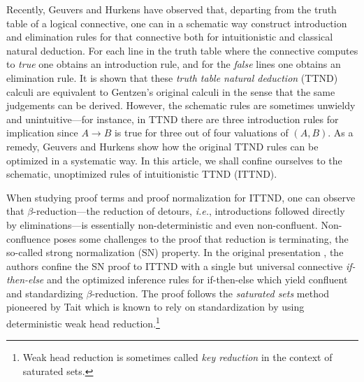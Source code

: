 \documentclass[a4paper,USenglish,cleveref, autoref, thm-restate]{lipics-v2021}
\newcommand{\ie}{\emph{i.e.}\xspace}
\begin{document}
Recently, Geuvers and Hurkens \cite{geuversHurkens:icla17} have
observed that, departing from the truth table of a logical connective,
one can in a schematic way construct introduction and elimination
rules for that connective both for intuitionistic and classical
natural deduction.  For each line in the truth table where the
connective computes to \emph{true} one obtains an introduction rule,
and for the \emph{false} lines one obtains an elimination rule.
It is shown that these \emph{truth table natural deduction} (TTND)
calculi are equivalent to Gentzen's original calculi
\cite{gentzen:natuerlichesSchliessen}
in the sense that the
same judgements can be derived.  However, the schematic rules are
sometimes unwieldy and unintuitive---for instance, in TTND there are three
introduction rules for implication since $A \to B$ is true for three
out of four valuations of $(A,B)$.  As a remedy, Geuvers and Hurkens
show how the original TTND rules can be optimized in a systematic
way.  In this article, we shall confine ourselves to the schematic,
unoptimized rules of intuitionistic TTND (ITTND).

When studying proof terms and proof normalization for ITTND, one can
observe that $\beta$-reduction---the reduction of detours, \ie, introductions followed
directly by eliminations\footnotemark---is essentially non-deterministic and even
non-confluent.
%
Non-confluence poses some challenges to the proof that reduction is
terminating, the so-called strong normalization (SN) property.  In the
original presentation \cite{geuversHurkens:icla17}, the authors
confine the SN proof to ITTND with a single but universal
connective \emph{if-then-else} and the optimized inference rules for
if-then-else which yield confluent and standardizing $\beta$-reduction.  The proof
follows the \emph{saturated sets} method pioneered by Tait
\cite{tait:functionalsFiniteTypeI} which is known to rely on
standardization by using deterministic weak head
reduction.\footnote{Weak head reduction is sometimes called \emph{key
  reduction} in the context of saturated sets.}
\end{document}
